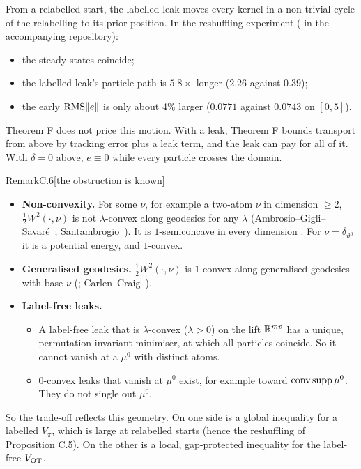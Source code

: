 From a relabelled start, the labelled leak moves every kernel in a non-trivial cycle of the relabelling to its prior
position. In the reshuffling experiment ( in the accompanying repository):
\begin{itemize}
  \item the steady states coincide;
  \item the labelled leak's particle path is $5.8\times$ longer ($2.26$ against $0.39$);
  \item the early $\operatorname{RMS}\lVert e\rVert$ is only about 4\% larger ($0.0771$ against $0.0743$ on $[0,5]$).
\end{itemize}
Theorem F does not price this motion. With a leak, Theorem F bounds transport from above by tracking error plus a
leak term, and the leak can pay for all of it. With $\delta = 0$ above, $e\equiv0$ while every particle crosses the
domain.

\begin{rmk}{Remark}{C.6}[the obstruction is known]
\leavevmode
\begin{itemize}
  \item \textbf{Non-convexity.} For some $\nu$, for example a two-atom $\nu$ in dimension $\ge 2$,
    $\frac12W^2(\cdot,\nu)$ is not $\lambda$-convex along geodesics for any $\lambda$
    (Ambrosio--Gigli--Savaré~\cite[Example~9.1.5]{ags2008}; Santambrogio~\cite[\S4.5]{R71}). It is
    $1$-semiconcave in every dimension \cite[Thm.~7.3.2]{ags2008}. For $\nu = \delta_{\vartheta^0}$ it is a
    potential energy, and $1$-convex.
  \item \textbf{Generalised geodesics.} $\frac12W^2(\cdot,\nu)$ is $1$-convex along generalised geodesics with base
    $\nu$ (\cite[Lemma~9.2.1]{ags2008}; Carlen--Craig~\cite{R73}).
  \item \textbf{Label-free leaks.}
    \begin{itemize}
      \item A label-free leak that is $\lambda$-convex ($\lambda > 0$) on the lift $\mathbb{R}^{mp}$ has a unique,
        permutation-invariant minimiser, at which all particles coincide. So it cannot vanish at a $\mu^0$ with
        distinct atoms.
      \item $0$-convex leaks that vanish at $\mu^0$ exist, for example toward $\operatorname{conv}\operatorname{supp}\mu^0$. They
        do not single out $\mu^0$.
    \end{itemize}
\end{itemize}
So the trade-off reflects this geometry. On one side is a global inequality for a labelled $V_\pi$, which is large
at relabelled starts (hence the reshuffling of Proposition C.5). On the other is a local, gap-protected inequality
for the label-free $V_{\mathrm{OT}}$.
\end{rmk}
